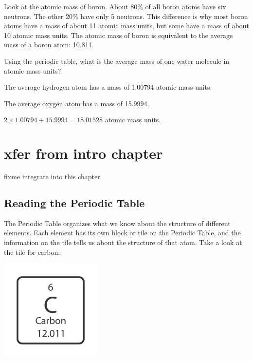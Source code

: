 Look at the atomic mass of boron. About 80\% of all boron atoms have
six neutrons. The other 20\% have only 5 neutrons. This difference is why most boron atoms
have a mass of about 11 atomic mass units, but some have a mass of
about 10 atomic mass units. The atomic mass of boron is equivalent to the average
mass of a boron atom: 10.811.

\begin{Exercise}[title={Mass of a Water Molecule}, label=water_mass]

Using the periodic table, what is the average mass of one water molecule in atomic mass units?

\end{Exercise}
\begin{Answer}[ref=water_mass]

  The average hydrogen atom has a mass of 1.00794 atomic mass units.

  The average oxygen atom has a mass of 15.9994.

  $2 \times 1.00794 + 15.9994 = 18.01528$ atomic mass units.

\end{Answer}

\section{xfer from intro chapter} 
fixme integrate into this chapter
\subsection{Reading the Periodic Table}
The Periodic Table organizes what we know about the structure of different
elements. Each element has its own block or tile on the Periodic Table, and the
information on the tile tells us about the structure of that atom. Take a look at
the tile for carbon:

\begin{center}
\includegraphics[width=2in]{carbon_tile.png}
\end{center}

